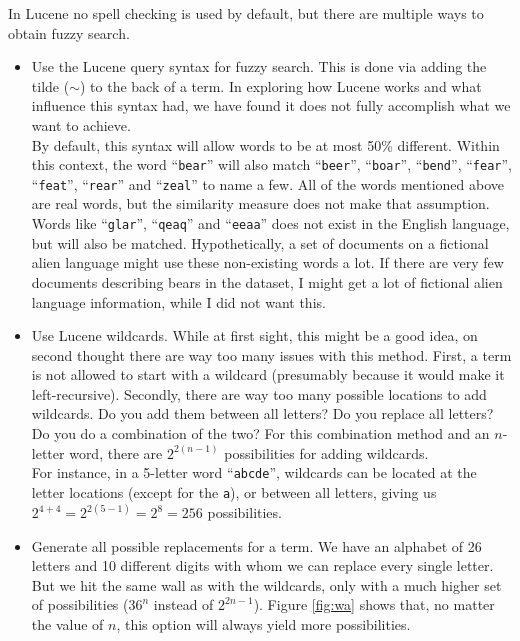 \documentclass[11pt]{article}
\begin{document}
In Lucene no spell checking is used by default, but there are multiple ways to obtain fuzzy search.
\begin{itemize}
    \item Use the Lucene query syntax for fuzzy search. This is done via adding the tilde ($\sim$) to the back of a term. In exploring how Lucene works and what influence this syntax had, we have found it does not fully accomplish what we want to achieve.\\
    By default, this syntax will allow words to be at most 50\% different. Within this context, the word ``\texttt{bear}'' will also match ``\texttt{beer}'', ``\texttt{boar}'', ``\texttt{bend}'', ``\texttt{fear}'', ``\texttt{feat}'', ``\texttt{rear}'' and ``\texttt{zeal}'' to name a few. All of the words mentioned above are real words, but the similarity measure does not make that assumption. Words like ``\texttt{glar}'', ``\texttt{qeaq}'' and ``\texttt{eeaa}'' does not exist in the English language, but will also be matched. Hypothetically, a set of documents on a fictional alien language might use these non-existing words a lot. If there are very few documents describing bears in the dataset, I might get a lot of fictional alien language information, while I did not want this.
    \item Use Lucene wildcards. While at first sight, this might be a good idea, on second thought there are way too many issues with this method. First, a term is not allowed to start with a wildcard (presumably because it would make it left-recursive). Secondly, there are way too many possible locations to add wildcards. Do you add them between all letters? Do you replace all letters? Do you do a combination of the two? For this combination method and an $n$-letter word, there are $2^{2(n - 1)}$ possibilities for adding wildcards.\\
    For instance, in a 5-letter word ``\texttt{abcde}'', wildcards can be located at the letter locations (except for the \texttt{a}), or between all letters, giving us $2^{4+4} = 2^{2(5-1)} = 2^8 = 256$ possibilities.
    \item Generate all possible replacements for a term. We have an alphabet of 26 letters and 10 different digits with whom we can replace every single letter. But we hit the same wall as with the wildcards, only with a much higher set of possibilities ($36^{n}$ instead of $2^{2n-1}$). Figure \ref{fig:wa} shows that, no matter the value of $n$, this option will always yield more possibilities.
    \begin{figure}[h!]

\end{figure}
\end{itemize}
\end{document}

